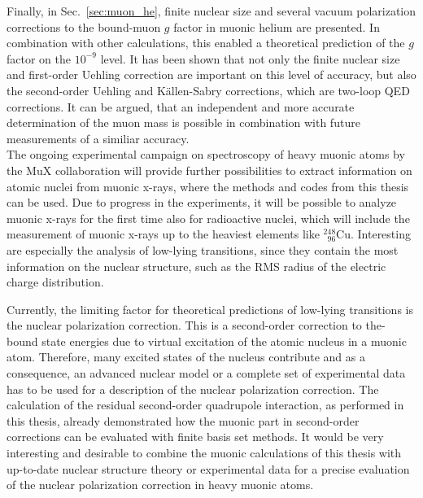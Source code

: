 Finally, in Sec.~\ref{sec:muon_he}, finite nuclear size and several vacuum polarization corrections to the bound-muon $g$ factor in muonic helium are presented. In combination with other calculations, this enabled a theoretical prediction of the $g$ factor on the $10^{-9}$ level. It has been shown that not only the finite nuclear size and first-order Uehling correction are important on this level of accuracy, but also the second-order Uehling and Källen-Sabry corrections, which are two-loop QED corrections.
It can be argued, that an independent and more accurate determination of the muon mass is possible in combination with future measurements of a similiar accuracy.\\[0.3cm]

The ongoing experimental campaign on spectroscopy of heavy muonic atoms by the MuX collaboration will provide further possibilities to extract information on atomic nuclei from muonic x-rays, where the methods and codes from this thesis can be used. 
Due to progress in the experiments, it will be possible to analyze muonic x-rays for the first time also for radioactive nuclei, which will include the measurement of muonic x-rays up to the heaviest elements like $_{\phantom{1}96}^{248}$Cu.
Interesting are especially the analysis of low-lying transitions, since they contain the most information on the nuclear structure, such as the RMS radius of the electric charge distribution.

Currently, the limiting factor for theoretical predictions of low-lying transitions is the nuclear polarization correction. This is a second-order correction to the-bound state energies due to virtual excitation of the atomic nucleus in a muonic atom. Therefore, many excited states of the nucleus contribute and as a consequence, an advanced nuclear model or a complete set of experimental data has to be used for a description of the nuclear polarization correction.
The calculation of the residual second-order quadrupole interaction, as performed in this thesis, already demonstrated how the muonic part in second-order corrections can be evaluated with finite basis set methods. It would be very interesting and desirable to combine the muonic calculations of this thesis with up-to-date nuclear structure theory or experimental data for a precise evaluation of the nuclear polarization correction in heavy muonic atoms.

